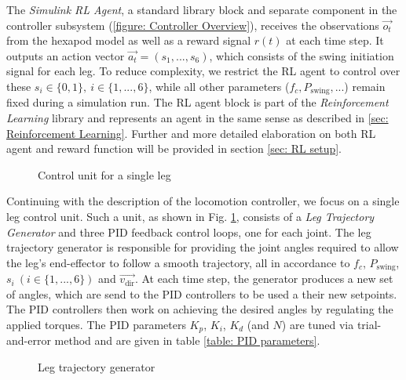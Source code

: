 The \textit{Simulink RL Agent}, a standard library block and separate component in the controller subsystem (\ref{figure: Controller Overview}), receives the observations $\vec{o_t}$ from the hexapod model as well as a reward signal $r(t)$ at each time step.
It outputs an action vector $\vec{a_t} = (s_1,...,s_6)$, which consists of the swing initiation signal for each leg.
To reduce complexity, we restrict the RL agent to control over these $s_i \in \{0,1\},\ i \in \{1,...,6\}$, while all other parameters ($f_c, P_\text{swing},...$) remain fixed during a simulation run.
The RL agent block is part of the \textit{Reinforcement Learning} library and represents an agent in the same sense as described in \ref{sec: Reinforcement Learning}.
Further and more detailed elaboration on both RL agent and reward function will be provided in section \ref{sec: RL setup}.

\begin{figure}
	\centerline{}
	\caption[Single leg control unit]{Control unit for a single leg}
	\label{figure: Leg control unit}
\end{figure}

Continuing  with the description of the locomotion controller, we focus on a single leg control unit.
Such a unit, as shown in Fig. \ref{figure: Leg control unit}, consists of a \textit{Leg Trajectory Generator} and three PID feedback control loops, one for each joint.
The leg trajectory generator is responsible for providing the joint angles required to allow the leg's end-effector to follow a smooth trajectory, all in accordance to $f_c$, $P_\text{swing}$, $s_i\ (i \in \{1,...,6\})$ and $\vec{v_\text{dir}}$.
At each time step, the generator produces a new set of angles, which are send to the PID controllers to be used a their new setpoints.
The PID controllers then work on achieving the desired angles by regulating the applied torques.
The PID parameters $K_p$, $K_i$, $K_d$ (and $N$) are tuned via trial-and-error method and are given in table \ref{table: PID parameters}.

\begin{figure}
	\centerline{}
	\caption[Leg Trajectory Generator]{Leg trajectory generator}
	\label{figure: Leg trajectory generator}
\end{figure}

